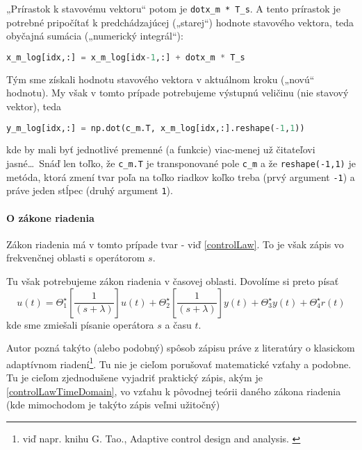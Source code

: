 \documentclass[a4paper, 10pt, ]{article}
\begin{document}
„Prírastok k stavovému vektoru“ potom je \lstinline|dotx_m * T_s|. A tento prírastok je potrebné pripočítať k predchádzajúcej („starej“) hodnote stavového vektora, teda obyčajná sumácia („numerický integrál“):
\begin{lstlisting}[language=Python,
                    numbers=none,
                    caption={},
                    label={vypk_sht02},
                    ]
x_m_log[idx,:] = x_m_log[idx-1,:] + dotx_m * T_s
\end{lstlisting}
Tým sme získali hodnotu stavového vektora v aktuálnom kroku („novú“ hodnotu). My však v tomto prípade potrebujeme výstupnú veličinu (nie stavový vektor), teda
\begin{lstlisting}[language=Python,
                    numbers=none,
                    caption={},
                    label={vypk_sht03},
                    ]
y_m_log[idx,:] = np.dot(c_m.T, x_m_log[idx,:].reshape(-1,1))
\end{lstlisting}
kde by mali byť jednotlivé premenné (a funkcie) viac-menej už čitateľovi jasné\ldots\  Snáď len toľko, že \lstinline|c_m.T| je transponované pole \lstinline|c_m| a že \lstinline|reshape(-1,1)| je metóda, ktorá zmení tvar poľa na toľko riadkov koľko treba (prvý argument \lstinline|-1|) a práve jeden stĺpec (druhý argument \lstinline|1|).







\paragraph{O zákone riadenia}

Zákon riadenia má v tomto prípade tvar - viď \eqref{controlLaw}. To je však zápis vo frekvenčnej oblasti s operátorom $s$.

Tu však potrebujeme zákon riadenia v časovej oblasti. Dovolíme si preto písať
\begin{equation} \label{controlLawTimeDomain}
	u(t) = \Theta_1^\star  \left[ \frac{1}{(s + \lambda)} \right] u(t)
    + \Theta_2^\star \left[ \frac{1}{(s + \lambda)} \right] y(t)
    + \Theta_3^\star y(t) + \Theta_4^\star r(t)
\end{equation}
kde sme zmiešali písanie operátora $s$ a času $t$.

Autor pozná takýto (alebo podobný) spôsob zápisu práve z literatúry o klasickom adaptívnom riadení\footnote{viď napr. knihu G. Tao., Adaptive control design and analysis. \cite{Tao2003}}. Tu nie je cieľom porušovať matematické vzťahy a podobne. Tu je cieľom zjednodušene vyjadriť praktický zápis, akým je \eqref{controlLawTimeDomain}, vo vzťahu k pôvodnej teórii daného zákona riadenia (kde mimochodom je takýto zápis veľmi užitočný)
\end{document}
